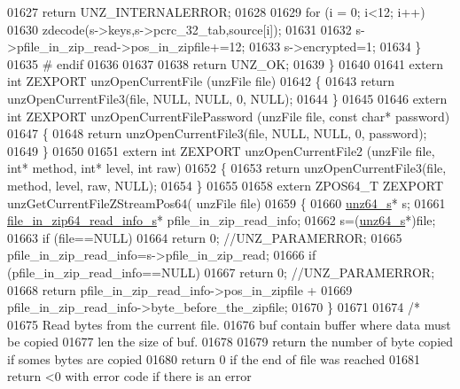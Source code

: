 \begin{DoxyCode}
01627             \textcolor{keywordflow}{return} UNZ\_INTERNALERROR;
01628 
01629         \textcolor{keywordflow}{for} (i = 0; i<12; i++)
01630             zdecode(s->keys,s->pcrc\_32\_tab,source[i]);
01631 
01632         s->pfile\_in\_zip\_read->pos\_in\_zipfile+=12;
01633         s->encrypted=1;
01634     \}
01635 \textcolor{preprocessor}{#    endif}
01636 
01637 
01638     \textcolor{keywordflow}{return} UNZ\_OK;
01639 \}
01640 
01641 \textcolor{keyword}{extern} \textcolor{keywordtype}{int} ZEXPORT unzOpenCurrentFile (unzFile file)
01642 \{
01643     \textcolor{keywordflow}{return} unzOpenCurrentFile3(file, NULL, NULL, 0, NULL);
01644 \}
01645 
01646 \textcolor{keyword}{extern} \textcolor{keywordtype}{int} ZEXPORT unzOpenCurrentFilePassword (unzFile file, \textcolor{keyword}{const} \textcolor{keywordtype}{char}*  password)
01647 \{
01648     \textcolor{keywordflow}{return} unzOpenCurrentFile3(file, NULL, NULL, 0, password);
01649 \}
01650 
01651 \textcolor{keyword}{extern} \textcolor{keywordtype}{int} ZEXPORT unzOpenCurrentFile2 (unzFile file, \textcolor{keywordtype}{int}* method, \textcolor{keywordtype}{int}* level, \textcolor{keywordtype}{int} raw)
01652 \{
01653     \textcolor{keywordflow}{return} unzOpenCurrentFile3(file, method, level, raw, NULL);
01654 \}
01655 
01658 \textcolor{keyword}{extern} ZPOS64\_T ZEXPORT unzGetCurrentFileZStreamPos64( unzFile file)
01659 \{
01660     \hyperlink{structunz64__s}{unz64\_s}* s;
01661     \hyperlink{structfile__in__zip64__read__info__s}{file\_in\_zip64\_read\_info\_s}* pfile\_in\_zip\_read\_info;
01662     s=(\hyperlink{structunz64__s}{unz64\_s}*)file;
01663     \textcolor{keywordflow}{if} (file==NULL)
01664         \textcolor{keywordflow}{return} 0; \textcolor{comment}{//UNZ\_PARAMERROR;}
01665     pfile\_in\_zip\_read\_info=s->pfile\_in\_zip\_read;
01666     \textcolor{keywordflow}{if} (pfile\_in\_zip\_read\_info==NULL)
01667         \textcolor{keywordflow}{return} 0; \textcolor{comment}{//UNZ\_PARAMERROR;}
01668     \textcolor{keywordflow}{return} pfile\_in\_zip\_read\_info->pos\_in\_zipfile +
01669                          pfile\_in\_zip\_read\_info->byte\_before\_the\_zipfile;
01670 \}
01671 
01674 \textcolor{comment}{/*}
01675 \textcolor{comment}{  Read bytes from the current file.}
01676 \textcolor{comment}{  buf contain buffer where data must be copied}
01677 \textcolor{comment}{  len the size of buf.}
01678 \textcolor{comment}{}
01679 \textcolor{comment}{  return the number of byte copied if somes bytes are copied}
01680 \textcolor{comment}{  return 0 if the end of file was reached}
01681 \textcolor{comment}{  return <0 with error code if there is an error}

\end{DoxyCode}
